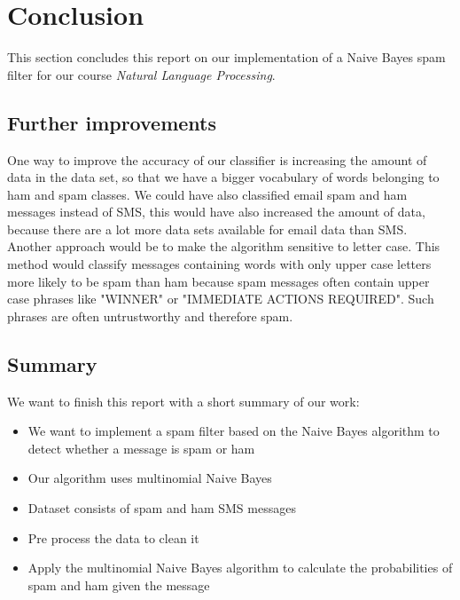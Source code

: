 \section{Conclusion}
This section concludes this report on our implementation of a Naive Bayes spam filter for our course \textit{Natural Language Processing}.

\subsection{Further improvements}
One way to improve the accuracy of our classifier is increasing the amount of data in the data set, so that we have a bigger vocabulary of words belonging to ham and spam classes. We could have also classified email spam and ham messages instead of SMS, this would have also increased the amount of data, because there are a lot more data sets available for email data than SMS. \\
Another approach would be to make the algorithm sensitive to letter case. This method would classify messages containing words with only upper case letters more likely to be spam than ham because spam messages often contain upper case phrases like "WINNER" or "IMMEDIATE ACTIONS REQUIRED". Such phrases are often untrustworthy and therefore spam.

\subsection{Summary}
We want to finish this report with a short summary of our work:

\begin{itemize}
	\item We want to implement a spam filter based on the Naive Bayes algorithm to detect whether a message is spam or ham
	\item Our algorithm uses multinomial Naive Bayes
	\item Dataset consists of spam and ham SMS messages
	\item Pre process the data to clean it
	\item Apply the multinomial Naive Bayes algorithm to calculate the probabilities of spam and ham given the message
\end{itemize}

